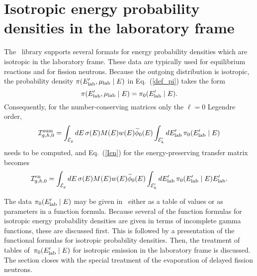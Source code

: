 \chapter{Isotropic energy probability densities in the laboratory frame}
\label{Sec:isotropic-lab}
The \xendl\ library supports several formats for energy probability densities
which are isotropic in the
laboratory frame.  These data are typically used for equilibrium
reactions and for fission neutrons.  Because the outgoing
distribution is isotropic, the probability density
$\pi(E_{\text{lab}}', \mu_{\text{lab}}   \mid E)$ in Eq.~(\ref{def_pi}) takes the form
\begin{equation}
  \pi(E_{\text{lab}}', \mu_{\text{lab}}   \mid E) = \pi_0(E_{\text{lab}}' \mid E).
 \label{isotropic-pi}
\end{equation}
Consequently, for the number-conserving
matrices only the $\ell = 0$ Legendre order,
\begin{equation}
   {\cal I}^{\text{num}}_{g,h,0} =
     \int_{{\cal E}_g} dE \, \sigma ( E ) M(E) w(E) \widetilde \phi_0(E)
   \int_{{\cal E}_h'} dE_{\text{lab}}' \, \pi_0(E_{\text{lab}}' \mid E)
 \label{InumI4-0}
\end{equation}
needs to be computed,
and Eq.~(\ref{Ien}) for the energy-preserving transfer matrix becomes
\begin{equation}
   {\cal I}^{\text{en}}_{g,h,0} =
     \int_{{\cal E}_g} dE \, \sigma ( E ) M(E) w(E) \widetilde \phi_0(E) 
     \int_{{\cal E}_h'} dE_{\text{lab}}' \, \pi_0(E_{\text{lab}}' \mid E) E_{\text{lab}}'.
 \label{IenI4-0}
\end{equation}

The data $\pi_0(E_{\text{lab}}' \mid E)$ may be given in \xendl\ either as
a table of values or as parameters in a function formula.
Because several of the function formulas for isotropic energy
probability densities are given in terms of incomplete gamma
functions, these are discussed first.  This is followed by a presentation
of the functional formulas for isotropic probability densities.  Then,
 the treatment of tables of~$\pi_0(E_{\text{lab}}' \mid E)$ for isotropic emission
 in the laboratory frame is discussed.  The section closes with
 the special treatment of the evaporation of delayed fission neutrons.


